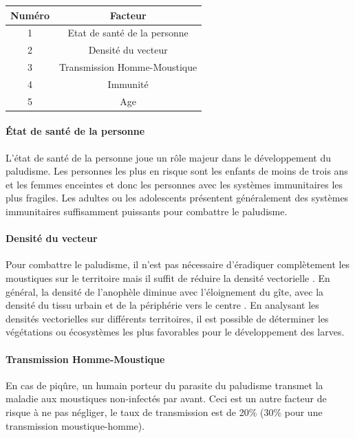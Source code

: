 \begin{center}

\begin{tabular}{|c|c|} 
\hline
\textbf{Numéro} & \textbf{Facteur}\\
\hline
1 & Etat de santé de la personne\\
\hline
2 & Densité du vecteur\\
\hline
3 & Transmission Homme-Moustique\\
\hline
4 & Immunité\\
\hline
5 & Age \\
\hline
\end{tabular}
\end{center}

\paragraph{État de santé de la personne}

L'état de santé de la personne joue un rôle majeur dans le développement du paludisme. Les personnes les plus en risque sont les enfants de moins de trois ans et les femmes enceintes et donc les personnes avec les systèmes immunitaires les plus fragiles. Les adultes ou les adolescents présentent généralement des systèmes immunitaires suffisamment puissants pour combattre le paludisme. 
\citep{Protopopoff2009}

\paragraph{Densité du vecteur}

Pour combattre le paludisme, il n'est pas nécessaire d'éradiquer complètement les moustiques sur le territoire mais il suffit de réduire la densité vectorielle \citep{Gaudart}. En général, la densité de l'anophèle diminue avec l'éloignement du gîte, avec la densité du tissu urbain et de la périphérie vers le centre \citep{Gaudart}. En analysant les densités vectorielles sur différents territoires, il est possible de déterminer les végétations ou écosystèmes les plus favorables pour le développement des larves.

\paragraph{Transmission Homme-Moustique}

En cas de piqûre, un humain porteur du parasite du paludisme transmet la maladie aux moustiques non-infectés par avant. Ceci est un autre facteur de risque à ne pas négliger, le taux de transmission est de 20\% (30\% pour une transmission moustique-homme).

